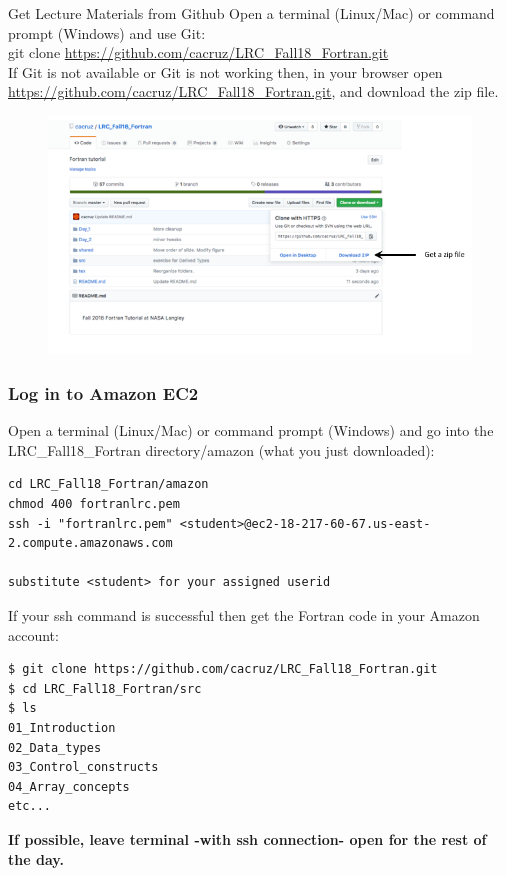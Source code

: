 \documentclass[11pt]{beamer}
\begin{document}
\begin{frame}{Get Lecture Materials from Github}
\footnotesize{Open a terminal (Linux/Mac) or command prompt (Windows) and use Git:\\}
\footnotesize{\quad git clone \url{https://github.com/cacruz/LRC_Fall18_Fortran.git}}\\
\vspace{5mm}
If Git is not available or Git is not working then, in your browser open \url{https://github.com/cacruz/LRC_Fall18_Fortran.git}, and download the zip file.
\begin{figure}[t]
\centering
\includegraphics[scale=.25]{../../shared/github_zip}
\end{figure}

\end{frame}


\begin{frame}[fragile]
\frametitle{Log in to Amazon EC2}

\footnotesize{Open a terminal (Linux/Mac) or command prompt (Windows) and go into the LRC\_Fall18\_Fortran directory/amazon (what you just downloaded):}

\tiny{
\begin{Verbatim} 
cd LRC_Fall18_Fortran/amazon
chmod 400 fortranlrc.pem
ssh -i "fortranlrc.pem" <student>@ec2-18-217-60-67.us-east-2.compute.amazonaws.com

substitute <student> for your assigned userid
\end{Verbatim}
}
\footnotesize{If your ssh command is successful then get the Fortran code in your Amazon account:}
\scriptsize{
\begin{Verbatim} 
$ git clone https://github.com/cacruz/LRC_Fall18_Fortran.git
$ cd LRC_Fall18_Fortran/src
$ ls
01_Introduction
02_Data_types
03_Control_constructs
04_Array_concepts
etc...
\end{Verbatim}
}
\begin{center}
\textbf{If possible, leave terminal -with ssh connection- open for the rest of the day.}
\end{center}
\end{frame}
\end{document}
